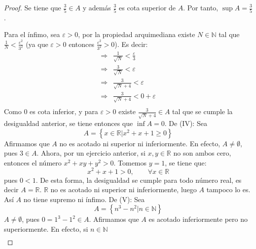 \documentclass[12pt]{article}
\begin{document}
\begin{enumerate}
\begin{proof}
        Se tiene que $\frac{3}{5}\in A$ y además $\frac{3}{5}$ es cota superior de $A$. Por tanto, $\sup A = \frac{3}{5}$.

        Para el ínfimo, sea $\varepsilon > 0$, por la propiedad arquimediana existe $N\in\mathbb{N}$ tal que $\frac{1}{N}<\frac{\varepsilon^2}{3^2}$ (ya que $\varepsilon > 0$ entonces $\frac{\varepsilon^2}{3^2} > 0$). Es decir:
        \begin{equation*}
            \begin{split}
                \Rightarrow &\frac{1}{\sqrt{N}}<\frac{\varepsilon}{3} \\
                \Rightarrow &\frac{3}{\sqrt{N}}< \varepsilon \\
                \Rightarrow &\frac{3}{\sqrt{N}+4}< \varepsilon \\
                \Rightarrow &\frac{3}{\sqrt{N}+4}< 0+\varepsilon \\
            \end{split}
        \end{equation*}
        Como $0$ es cota inferior, y para $\varepsilon>0$ existe $\frac{3}{\sqrt{N}+4}\in A$ tal que se cumple la desigualdad anterior, se tiene entonces que $\inf A = 0$.
        De (IV): Sea
        \begin{equation*}
            A = \left\{x\in\mathbb{R}|x^2+x+1\geq 0\right\}
        \end{equation*}
        Afirmamos que $A$ no es acotado ni superior ni inferiormente. En efecto, $A\neq \emptyset$, pues $3\in A$. Ahora, por un ejercicio anterior, si $x,y\in\mathbb{R}$ no son ambos cero, entonces el número $x^2+xy+y^2>0$. Tomemos $y=1$, se tiene que:
        \begin{equation*}
            x^2+x+1>0,\qquad\forall x\in\mathbb{R}
        \end{equation*}
        pues $0<1$. De esta forma, la desigualdad se cumple para todo número real, es decir $A=\mathbb{R}$. $\mathbb{R}$ no es acotado ni superior ni inferiormente, luego $A$ tampoco lo es. Así $A$ no tiene supremo ni ínfimo.
        De (V): Sea
        \begin{equation*}
            A =  \left\{n^3-n^2|n\in\mathbb{N}\right\}
        \end{equation*}
        $A\neq \emptyset$, pues $0=1^3-1^2\in A$. Afirmamos que $A$ es acotado inferiormente pero no superiormente. En efecto, si $n\in\mathbb{N}$
        \begin{equation*}
            \begin{split}

\end{split}
\end{equation*}
\end{proof}
\end{enumerate}
\end{document}
